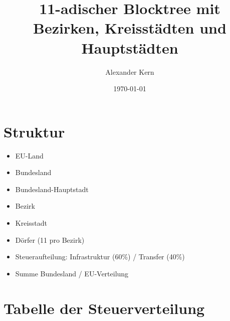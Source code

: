 \documentclass[a4paper,12pt]{article}
\title{11-adischer Blocktree mit Bezirken, Kreisstädten und Hauptstädten}
\author{Alexander Kern}
\date{\today}
\begin{document}
\maketitle

\section{Struktur}

\begin{itemize}
\item EU-Land  
\item Bundesland  
\item Bundesland-Hauptstadt  
\item Bezirk  
\item Kreisstadt  
\item Dörfer (11 pro Bezirk)  
\item Steueraufteilung: Infrastruktur (60\%) / Transfer (40\%)  
\item Summe Bundesland / EU-Verteilung
\end{itemize}

\section{Tabelle der Steuerverteilung}

\renewcommand{\arraystretch}{1.2}
\setlength{\tabcolsep}{3pt}
\end{document}
